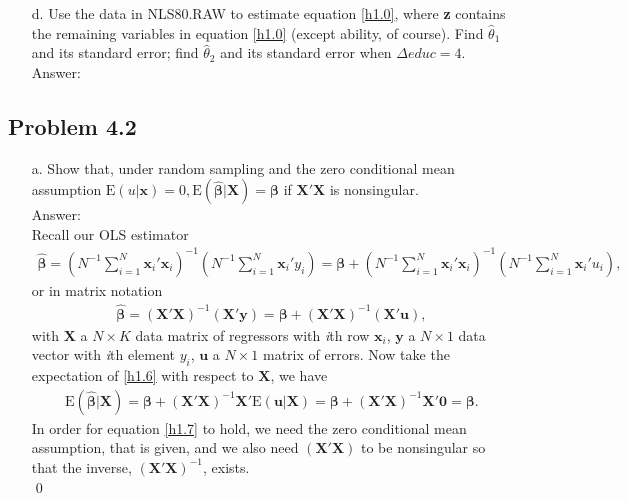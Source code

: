 \documentclass[10pt]{article}
\newcommand{\E}{\text{E}}
\begin{document}
\begin{enumerate}
\item[d.] Use the data in NLS80.RAW to estimate equation \eqref{h1.0}, where \textbf{z} contains the remaining variables in equation \eqref{h1.0} (except ability, of course). Find $\hat{\theta}_1$ and its standard error; find $\hat{\theta}_2$ and its standard error when $\Delta educ=4.$ 
\\ Answer:\\

\end{enumerate}

\subsection*{Problem 4.2}
\begin{enumerate}
\item[a.] Show that, under random sampling and the zero conditional mean assumption $\E(u|\mathbf{x})=0,\E(\hat{\pmb{\beta}}|\mathbf{X})=\pmb{\beta}$ if $\mathbf{X}'\mathbf{X}$ is nonsingular.
\\ Answer:\\

Recall our OLS estimator
\begin{align*}
\hat{\pmb{\beta}}=\left(N^{-1}\sum_{i=1}^N\mathbf{x}_i'\mathbf{x}_i\right)^{-1}\left(N^{-1}\sum_{i=1}^N\mathbf{x}_i'y_i\right)=\pmb{\beta}+\left(N^{-1}\sum_{i=1}^N\mathbf{x}_i'\mathbf{x}_i\right)^{-1}\left(N^{-1}\sum_{i=1}^N\mathbf{x}_i'u_i\right),
\end{align*}
or in matrix notation
\begin{align}
\hat{\pmb{\beta}}=(\mathbf{X'X})^{-1}(\mathbf{X'y})=\pmb{\beta}+(\mathbf{X'X})^{-1}(\mathbf{X'u}), \label{h1.6}
\end{align}
with $\mathbf{X}$ a $N\times K$ data matrix of regressors with \textit{i}th row $\textbf{x}_i$, $\mathbf{y}$ a $N\times 1$ data vector with \textit{i}th element $y_i$, $\textbf{u}$ a $N\times 1$ matrix of errors. Now take the expectation of \eqref{h1.6} with respect to $\textbf{X}$, we have
\begin{align}
    \E(\hat{\pmb{\beta}}|\textbf{X})=\pmb{\beta}+(\mathbf{X'X})^{-1}\mathbf{X'}\E(\textbf{u}|\textbf{X})=\pmb{\beta}+(\mathbf{X'X})^{-1}\mathbf{X'}\textbf{0}=\pmb{\beta}. \label{h1.7}
\end{align}
In order for equation \eqref{h1.7} to hold, we need the zero conditional mean assumption, that is given, and we also need $(\mathbf{X'X})$ to be nonsingular so that the inverse, $(\mathbf{X'X})^{-1}$, exists.\\ \qed


\end{enumerate}
\end{document}
